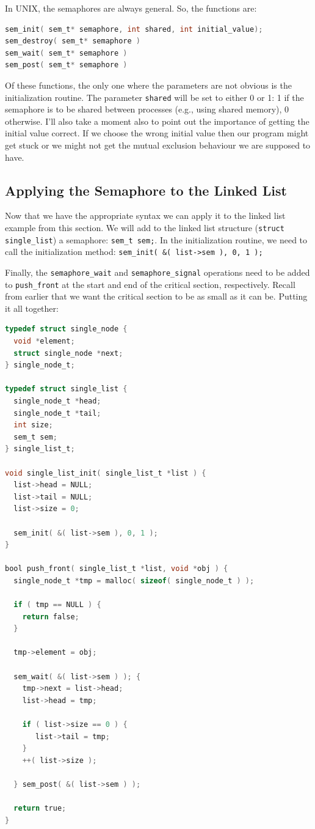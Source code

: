 \documentclass[a4paper]{report}
\begin{document}
In UNIX, the semaphores are always general. So, the functions are:

\begin{lstlisting}[language=C]
sem_init( sem_t* semaphore, int shared, int initial_value);
sem_destroy( sem_t* semaphore )
sem_wait( sem_t* semaphore )
sem_post( sem_t* semaphore )
\end{lstlisting}

Of these functions, the only one where the parameters are not obvious is the initialization routine. The parameter \texttt{shared} will be set to either 0 or 1: 1 if the semaphore is to be shared between processes (e.g., using shared memory), 0 otherwise. I'll also take a moment also to point out the importance of getting the initial value correct. If we choose the wrong initial value then our program might get stuck or we might not get the mutual exclusion behaviour we are supposed to have.

\subsection*{Applying the Semaphore to the Linked List}

Now that we have the appropriate syntax we can apply it to the linked list example from this section. We will add to the linked list structure (\texttt{struct single\_list}) a semaphore: \texttt{sem\_t sem;}. In the initialization routine, we need to call the initialization method: \texttt{sem\_init( \&( list->sem ), 0, 1 );}

Finally, the \texttt{semaphore\_wait} and \texttt{semaphore\_signal} operations need to be added to \texttt{push\_front} at the start and end of the critical section, respectively. Recall from earlier that we want the critical section to be as small as it can be. Putting it all together:

\begin{lstlisting}[language=C]
typedef struct single_node {
  void *element;
  struct single_node *next;
} single_node_t;

typedef struct single_list {
  single_node_t *head;
  single_node_t *tail;
  int size;
  sem_t sem;
} single_list_t;

void single_list_init( single_list_t *list ) {
  list->head = NULL;
  list->tail = NULL;
  list->size = 0;

  sem_init( &( list->sem ), 0, 1 );
}

bool push_front( single_list_t *list, void *obj ) {
  single_node_t *tmp = malloc( sizeof( single_node_t ) );
  
  if ( tmp == NULL ) {
    return false;
  }
  
  tmp->element = obj;
  
  sem_wait( &( list->sem ) ); {
    tmp->next = list->head;
    list->head = tmp;

    if ( list->size == 0 ) {
       list->tail = tmp;
    }
    ++( list->size );
  
  } sem_post( &( list->sem ) );  
  
  return true;
}
\end{lstlisting}
\end{document}
